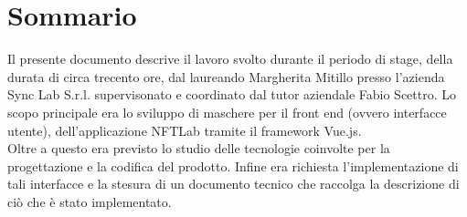 
\cleardoublepage
{}
{}
\begingroup
\let\clearpage\relax
\let\cleardoublepage\relax
\let\cleardoublepage\relax

\chapter*{Sommario}

Il presente documento descrive il lavoro svolto durante il periodo di stage, della durata di circa trecento ore, dal laureando Margherita Mitillo presso l'azienda Sync Lab S.r.l. supervisonato e coordinato dal tutor aziendale Fabio Scettro.
Lo scopo principale era lo sviluppo di maschere per il front end (ovvero interfacce utente), dell'applicazione NFTLab tramite il framework Vue.js.\\
Oltre a questo era previsto lo studio delle tecnologie coinvolte per la progettazione e la codifica del prodotto.
Infine era richiesta l'implementazione di tali interfacce e la stesura di un documento tecnico che raccolga la descrizione di ciò che è stato implementato.

%
%

\endgroup			

\vfill

